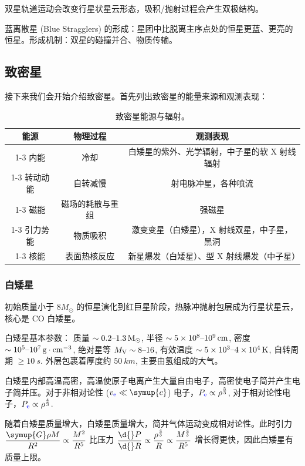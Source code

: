 \documentclass[../天体物理基础.tex]{subfiles}
\begin{document}
双星轨道运动会改变行星状星云形态，吸积/抛射过程会产生双极结构。

蓝离散星 (Blue Stragglers) 的形成：星团中比脱离主序点处的恒星更蓝、更亮的恒星。形成机制：双星的碰撞并合、物质传输。

\subsection{致密星}
接下来我们会开始介绍致密星。首先列出致密星的能量来源和观测表现：
\begin{table}[!htbp]
\centering
\caption{致密星能源与辐射。}
\begin{tabular}{c c c}
\hline
能源 & 物理过程 & 观测表现\\
\cline{1-3}
内能 & 冷却 & 白矮星的紫外、光学辐射，中子星的软 X 射线辐射\\
\cline{1-3}
转动动能 & 自转减慢 & 射电脉冲星，各种喷流\\
\cline{1-3}
磁能 & 磁场的耗散与重组 & 强磁星\\
\cline{1-3}
引力势能 & 物质吸积 & 激变变星（白矮星），X 射线双星，中子星，黑洞\\
\cline{1-3}
核能 & 表面热核反应 & 新星爆发（白矮星）、\uppercase\expandafter{\romannumeral1}型 X 射线爆发（中子星）\\
\hline
\end{tabular}
\label{致密星能源与辐射。}
\end{table}

\subsubsection{白矮星}
初始质量小于 $8M_{\odot}$ 的恒星演化到红巨星阶段，热脉冲抛射包层成为行星状星云，核心是 CO 白矮星。

白矮星基本参数：
质量 $\sim0.2\text{\textendash}\qty{1.3}{M_{\odot}}$, 半径 $\sim5\times10^{8}\text{\textendash}\qty{e9}{cm}$, 密度 $\sim10^{5}\text{\textendash}\qty{e7}{g\cdot cm^{-3}}$, 绝对星等 $M_{\mathrm{V}}\sim8\text{\textendash}16$, 有效温度 $\sim5\times10^{3}\text{\textendash}\qty{4e4}{K}$, 自转周期 $\ge\qty{10}{s}$. 外层包裹着厚度约 $\qty{50}{km}$, 主要由氢组成的大气。

白矮星内部高温高密，高温使原子电离产生大量自由电子，高密使电子简并产生电子简并压。对于非相对论性 ($v_{{\color{blue}{\ce{e}}}}\ll\symup{c}$) 电子，$P_{{\color{blue}{\ce{e}}}}\propto\rho^{\frac{5}{3}}$, 对于相对论性电子，$P_{{\color{blue}{\ce{e}}}}\propto\rho^{\frac{4}{3}}$.

随着白矮星质量增大，白矮星质量增大，简并气体运动变成相对论性。此时引力 $\dfrac{\symup{G}\rho{}M}{R^{2}}\propto\dfrac{M^{2}}{R^{5}}$ 比压力 $\dfrac{\d{}P}{\d{}R}\propto\dfrac{\rho^{\frac{4}{3}}}{R}\propto\dfrac{M^{\frac{4}{3}}}{R^{5}}$ 增长得更快，因此白矮星有质量上限。
\end{document}
